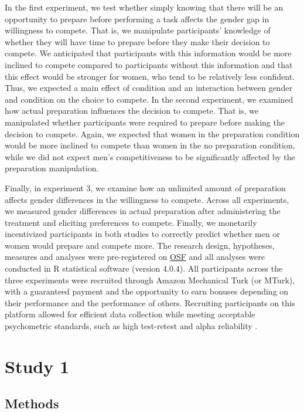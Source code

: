 \documentclass[a4paper,nobind]{templates/ociamthesis}
\begin{document}
In the first experiment, we test whether simply knowing that there will be an opportunity to prepare before performing a task affects the gender gap in willingness to compete. That is, we manipulate participants' knowledge of whether they will have time to prepare before they make their decision to compete. We anticipated that participants with this information would be more inclined to compete compared to participants without this information and that this effect would be stronger for women, who tend to be relatively less confident. Thus, we expected a main effect of condition and an interaction between gender and condition on the choice to compete. In the second experiment, we examined how actual preparation influences the decision to compete. That is, we manipulated whether participants were required to prepare before making the decision to compete. Again, we expected that women in the preparation condition would be more inclined to compete than women in the no preparation condition, while we did not expect men's competitiveness to be significantly affected by the preparation manipulation.

Finally, in experiment 3, we examine how an unlimited amount of preparation affects gender differences in the willingness to compete. Across all experiments, we measured gender differences in actual preparation after administering the treatment and eliciting preferences to compete. Finally, we monetarily incentivized participants in both studies to correctly predict whether men or women would prepare and compete more. The research design, hypotheses, measures and analyses were pre-registered on \href{https://osf.io/q39a5/}{OSF} and all analyses were conducted in R statistical software (version 4.0.4). All participants across the three experiments were recruited through Amazon Mechanical Turk (or MTurk), with a guaranteed payment and the opportunity to earn bonuses depending on their performance and the performance of others. Recruiting participants on this platform allowed for efficient data collection while meeting acceptable psychometric standards, such as high test-retest and alpha reliability \autocite{Rand2012,Buhrmester2011}.

\hypertarget{study-1}{%
\section{Study 1}\label{study-1}}

\hypertarget{methods}{%
\subsection{Methods}\label{methods}}
\end{document}
